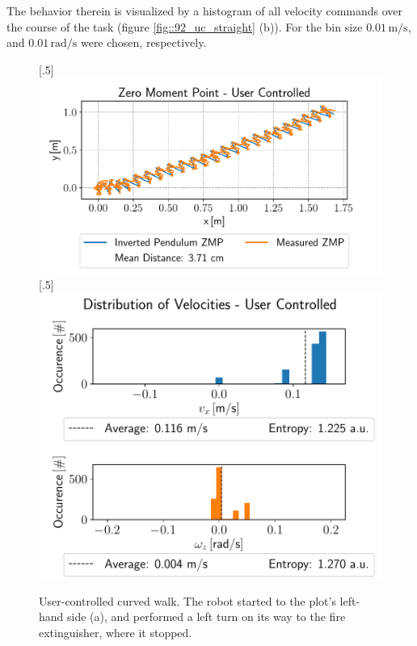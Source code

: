 The behavior therein is visualized by a histogram of all velocity commands over the course of the task (figure \ref{fig::92_uc_straight} (b)). For the bin size $0.01\,\text{m}/\text{s}$, and $0.01\,\text{rad}/\text{s}$ were chosen, respectively. 
\begin{figure}[h!]
	[.5\linewidth]{\includegraphics[scale=.45]{chapters/09_user_controlled_walking_experiments/img/02_test_environment/curved_walk_01_zmp.pdf}}
	[.5\linewidth]{\includegraphics[scale=.45]{chapters/09_user_controlled_walking_experiments/img/02_test_environment/curved_walk_01_entropy.pdf}}
	\caption{User-controlled curved walk. The robot started to the plot's left-hand side (a), and performed a left turn on its way to the fire extinguisher, where it stopped.}
	\label{fig::92_uc_curved}
\end{figure} 
